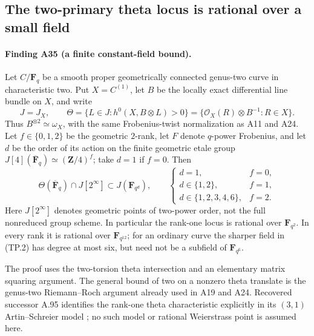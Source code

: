 \subsection{The two-primary theta locus is rational over a small field}
\label{sec:two-primary-theta-field}

\paragraph{Finding A35 (a finite constant-field bound).}
Let $C/\mathbf F_q$ be a smooth proper geometrically connected
genus-two curve in characteristic two. Put $X=C^{(1)}$, let $B$ be
the locally exact differential line bundle on $X$, and write
\[
 J=J_X,\qquad
 \Theta=\{L\in J:h^0(X,B\otimes L)>0\}
       =\{\mathcal O_X(R)\otimes B^{-1}:R\in X\}.
 \tag{TP.1}
\]
Thus $B^{\otimes2}\simeq\omega_X$, with the same Frobenius-twist
normalization as A11 and A24. Let $f\in\{0,1,2\}$ be the
geometric $2$-rank, let $F$ denote $q$-power Frobenius, and let
$d$ be the order of its action on the finite geometric etale group
$J[4](\overline{\mathbf F}_q)\simeq(\mathbf Z/4)^f$; take $d=1$
if $f=0$. Then
\[
 \Theta(\overline{\mathbf F}_q)\cap J[2^\infty]
              \subset J(\mathbf F_{q^d}),
 \qquad
 \begin{cases}
 d=1,&f=0,\\
 d\in\{1,2\},&f=1,\\
 d\in\{1,2,3,4,6\},&f=2.
 \end{cases}
 \tag{TP.2}
\]
Here $J[2^\infty]$ denotes geometric points of two-power order,
not the full nonreduced group scheme. In particular the rank-one
locus is rational over $\mathbf F_{q^2}$. In every rank it is
rational over $\mathbf F_{q^{12}}$; for an ordinary curve the
sharper field in (TP.2) has degree at most six, but need not be a
subfield of $\mathbf F_{q^6}$.

The proof uses the two-torsion theta intersection and an elementary
matrix squaring argument. The general bound of two on a nonzero
theta translate is the genus-two Riemann--Roch argument already
used in A19 and A24. Recovered successor A.95 identifies the
rank-one theta characteristic explicitly in its $(3,1)$
Artin--Schreier model \cite[A.95]{ASrun}; no such model or rational
Weierstrass point is assumed here.

